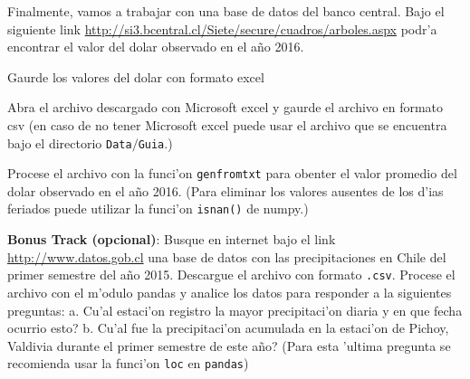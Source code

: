 \documentclass[11pt]{exam}
\begin{document}
\begin{questions}
\newpage	

Finalmente, vamos a trabajar con una base de datos del banco central. Bajo el siguiente link \url{http://si3.bcentral.cl/Siete/secure/cuadros/arboles.aspx} podr'a encontrar el valor del dolar observado en el a\~{n}o 2016.
\item Gaurde los valores del dolar con formato excel
\item Abra el archivo descargado con Microsoft excel y gaurde el archivo en formato csv (en caso de no tener Microsoft excel puede usar el archivo que se encuentra bajo el directorio \texttt{Data$/$Guia}.) 
\item Procese el archivo con la funci'on \texttt{genfromtxt} para obenter el valor promedio del dolar observado en el a\~{n}o 2016. (Para eliminar los valores ausentes de los d'ias feriados puede utilizar la funci'on \texttt{isnan()} de numpy.)

\item \textbf{Bonus Track (opcional)}: Busque en internet bajo el link \url{http://www.datos.gob.cl} una base de datos con las precipitaciones en Chile del primer semestre del a\~{n}o 2015. Descargue el archivo con formato \texttt{.csv}. Procese el archivo con el m'odulo pandas y analice los datos para responder a la siguientes preguntas: a. Cu'al estaci'on registro la mayor precipitaci'on diaria y en que fecha ocurrio esto? b. Cu'al fue la precipitaci'on acumulada en la estaci'on de Pichoy, Valdivia durante el primer semestre de este a\~{n}o? (Para esta 'ultima pregunta se recomienda usar la funci'on \texttt{loc} en \texttt{pandas})
\end{questions}
\end{document}
